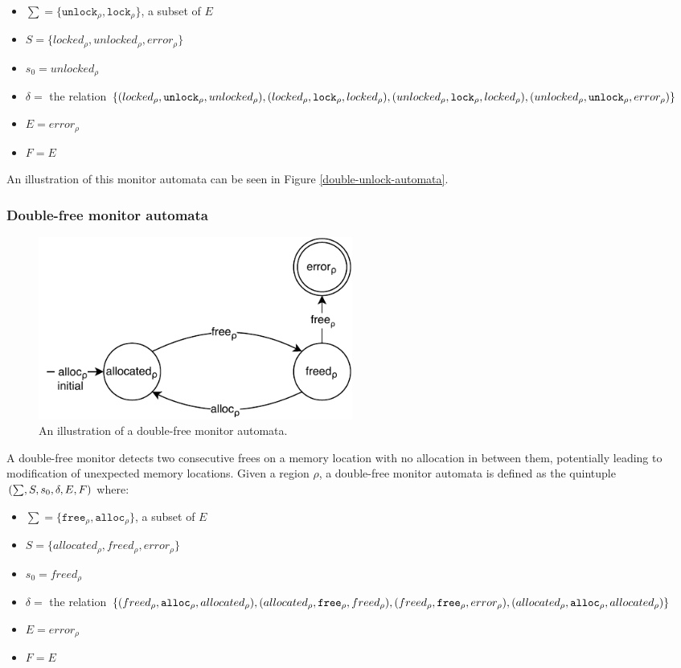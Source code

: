 \begin{itemize}
    \item $\sum = \{\texttt{unlock}_\rho, \texttt{lock}_\rho\}$, a subset of $E$
    \item $S = \{ locked_\rho, unlocked_\rho, error_\rho \}$
    \item $s_0 = unlocked_\rho$ 
    \item $\delta =$ the relation $\{(locked_\rho, \texttt{unlock}_\rho, unlocked_\rho), (locked_\rho, \texttt{lock}_\rho, locked_\rho), \\
        (unlocked_\rho, \texttt{lock}_\rho, locked_\rho), (unlocked_\rho, \texttt{unlock}_\rho, error_\rho)\}$ 
    \item $E = error_\rho$
    \item $F = E$
\end{itemize}

An illustration of this monitor automata can be seen in Figure \ref{double-unlock-automata}. 

\subsubsection*{Double-free monitor automata}

\begin{figure}[H]
    \centering
    \includegraphics[width=0.5\textwidth]{algorithm/figures/double-free}
    \caption{An illustration of a double-free monitor automata.}
    \label{double-free-automata}
\end{figure}

A double-free monitor detects two consecutive frees on a memory location with no allocation in between them, potentially leading to modification of unexpected memory locations. Given a region $\rho$, a double-free monitor automata is defined as the quintuple $(\sum, S, s_0, \delta, E, \\F)$ where: 

\begin{itemize}
    \item $\sum = \{\texttt{free}_\rho, \texttt{alloc}_\rho\}$, a subset of $E$
    \item $S = \{ allocated_\rho, freed_\rho, error_\rho \}$
    \item $s_0 = freed_\rho$ 
    \item $\delta =$ the relation $\{(freed_\rho, \texttt{alloc}_\rho, allocated_\rho), (allocated_\rho, \texttt{free}_\rho, freed_\rho), \\
    (freed_\rho, \texttt{free}_\rho, error_\rho), (allocated_\rho, \texttt{alloc}_\rho, allocated_\rho)\}$ 
    \item $E = error_\rho$  
    \item $F = E$
\end{itemize}

